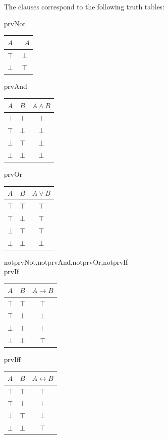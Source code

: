 \documentclass[10pt,a4paper]{article}
\theoremstyle{plain}
\theoremstyle{definition}
\theoremstyle{remark}
\newenvironment{explain}{}{}
\providecommand{\lif}{\mathbin{\rightarrow}}
\providecommand{\True}{\top}
\providecommand{\False}{\bot}
\providecommand{\iftag}[1]{#1}
\providecommand{\liff}{\mathbin{\leftrightarrow}}
\providecommand{\iftag}{}
\begin{document}
\begin{explain}
The clauses correspond to the following truth tables:
\begin{center}
\iftag{prvNot}{
  \begin{tabular}{|c||c|} \hline
    $A$ & $ \lnot A$ \\
    \hline \hline
    $\True$ & $\False$ \\
    $\False$ & $\True$ \\
    \hline
  \end{tabular}
}{}
\iftag{prvAnd}{
  \begin{tabular}{|cc||c|} \hline
    $A$ & $B$ & $A \land B$ \\
    \hline \hline
    $\True$ & $\True$ & $\True$ \\
    $\True$ & $\False$ & $\False$ \\
    $\False$ & $\True$ & $\False$ \\
    $\False$ & $\False$ & $\False$ \\
    \hline
  \end{tabular}
}{}
\iftag{prvOr}{
  \begin{tabular}{|cc||c|} \hline
    $A$ & $B$ & $A \lor B$ \\
    \hline \hline
    $\True$ & $\True$ & $\True$ \\
    $\True$ & $\False$ & $\True$ \\
    $\False$ & $\True$ & $\True$ \\
    $\False$ & $\False$ & $\False$ \\
    \hline
  \end{tabular}
}{}%
\iftag{notprvNot,notprvAnd,notprvOr,notprvIf}{}{\\[1em]}
\iftag{prvIf}{
  \begin{tabular}{|cc||c|} \hline
    $A$ & $B$ & $A \lif B$ \\
    \hline \hline
    $\True$ & $\True$ & $\True$ \\
    $\True$ & $\False$ & $\False$ \\
    $\False$ & $\True$ & $\True$ \\
    $\False$ & $\False$ & $\True$ \\
    \hline
  \end{tabular}
}{}
\iftag{prvIff}{
  \begin{tabular}{|cc||c|} \hline
    $A$ & $B$ & $A \liff B$ \\
    \hline \hline
    $\True$ & $\True$ & $\True$ \\
    $\True$ & $\False$ & $\False$ \\
    $\False$ & $\True$ & $\False$ \\
    $\False$ & $\False$ & $\True$ \\
    \hline
  \end{tabular}
}{}
\end{center}
\end{explain}
\end{document}
